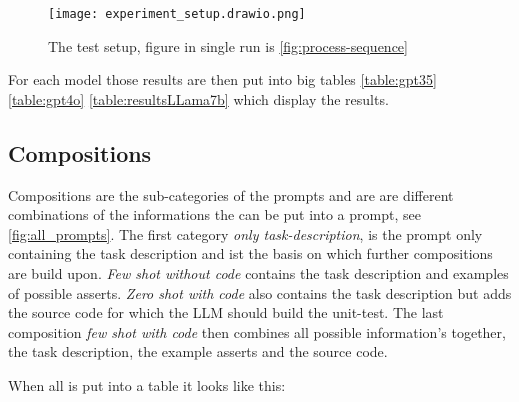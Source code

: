 \documentclass[a4paper,11pt,oneside]{memoir}
\begin{document}
\begin{figure}
    \centering
    \texttt{[image: experiment\_setup.drawio.png]}
    \caption{The test setup, figure in single run is \ref{fig:process-sequence}}
    \label{fig:experiment-setup}
\end{figure}

For each model those results are then put into big tables \ref{table:gpt35} \ref{table:gpt4o} \ref{table:resultsLLama7b} which display the results.  

\subsection{Compositions}
Compositions are the sub-categories of the prompts and are are different combinations of the informations the can be put into a prompt, see \ref{fig:all_prompts}.  
The first category \textit{only task-description}, is the prompt only containing the task description and ist the basis on which further compositions are build upon.
\textit{Few shot without code} contains the task description and examples of possible asserts.
\textit{Zero shot with code} also contains the task description but adds the source code for which the LLM should build the unit-test.
The last composition \textit{few shot with code} then combines all possible information's together, the task description, the example asserts and the source code. 

When all is put into a table it looks like this:

\begin{table}[!ht]
    \centering
    \label{table:exampleTable}
    \caption{Section of data which illustrates the table structure}
\end{table}
\end{document}
